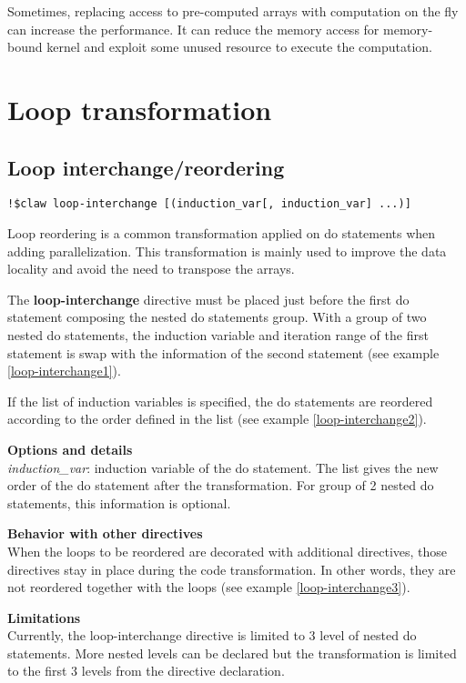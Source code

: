 \documentclass{article}
\begin{document}
Sometimes, replacing access to pre-computed arrays with computation on the fly
can increase the performance. It can reduce the memory access for memory-bound
kernel and exploit some unused resource to execute the computation.

\section{Loop transformation}
\subsection{Loop interchange/reordering}
\begin{lstlisting}
!$claw loop-interchange [(induction_var[, induction_var] ...)]
\end{lstlisting}

Loop reordering is a common transformation applied on do statements when adding parallelization. This transformation is mainly used to improve the data locality and avoid the need to transpose the arrays.

The \textbf{loop-interchange} directive must be placed just before the first do statement composing the nested do statements group. With a group of two nested do statements, the induction variable and iteration range of the first statement is swap with the information of the second statement (see example \ref{loop-interchange1}). 

If the list of induction variables is specified, the do statements are reordered according to the order defined in the list (see example \ref{loop-interchange2}).

\textbf{Options and details}\\
\textit{induction\_var}: induction variable of the do statement. The list gives the new order of the do statement after the transformation. For group of 2 nested do statements, this information is optional. 

\textbf{Behavior with other directives}\\
When the loops to be reordered are decorated with additional directives, those directives stay in place during the code transformation. In other words, they are not reordered together with the loops (see example \ref{loop-interchange3}).

\textbf{Limitations}\\
Currently, the loop-interchange directive is limited to 3 level of nested do statements. More nested levels can be declared but the transformation is limited to the first 3 levels from the directive declaration.
\end{document}
